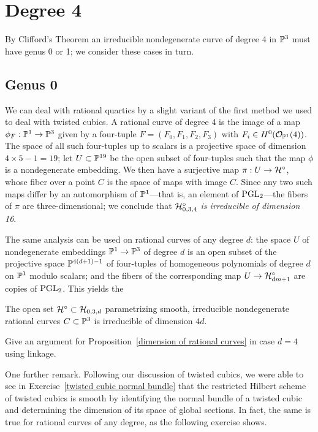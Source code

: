 \section{Degree 4}

By Clifford's Theorem  an irreducible nondegenerate curve of degree 4 in $\PP^{3}$ must have genus 0 or 1; we consider these cases in turn.

\subsection{Genus 0}\label{degree 4 genus 0}

We can deal with rational quartics by a slight variant of the first method we used to deal with twisted cubics. A rational curve of degree 4 is the image of a map $\phi_F : \PP^1 \to \PP^3$ given by a four-tuple $F = (F_0,F_1,F_2,F_3)$ with $F_i \in H^0(\cO_{\PP^1}(4))$. The space of all such four-tuples up to scalars is a projective space of dimension $4 \times 5 - 1 = 19$; let $U \subset \PP^{19}$ be the open subset of four-tuples such that the map $\phi$ is a nondegenerate embedding. We then have a surjective map $\pi : U \to \cH^\circ$, whose fiber over a point $C$ is the space of maps with image $C$. Since any two such maps differ by an automorphism of $\PP^1$---that is, an element of $\PGL_2$---the fibers of $\pi$ are three-dimensional; we conclude that \emph{$\cH^\circ_{0,3,4}$ is irreducible of dimension 16}.

The same analysis can be used on rational curves of any degree $d$: the space $U$ of nondegenerate embeddings $\PP^1 \to \PP^3$ of degree $d$ is an open subset of the projective space $\PP^{4(d+1)-1}$ of four-tuples of homogeneous polynomials of degree $d$ on $\PP^1$ modulo scalars; and the fibers of the corresponding map $U \to \cH^\circ_{dm+1}$ are copies of $\PGL_2$. This yields the

\begin{proposition}\label{dimension of rational curves}
The open set $\cH^\circ \subset \cH_{0,3,d}$ parametrizing smooth, irreducible nondegenerate rational curves $C \subset \PP^3$ is irreducible of dimension $4d$.
\end{proposition}

\begin{exercise}
Give an argument for Proposition~\ref{dimension of rational curves} in case $d=4$ using linkage. 
\end{exercise}

One further remark. Following our discussion of twisted cubics, we were able to see in Exercise~\ref{twisted cubic normal bundle} that the restricted Hilbert scheme of twisted cubics is smooth by identifying the normal bundle of a twisted cubic and determining the dimension of its space of global sections. In fact, the same is true for rational curves of any degree, as the following exercise shows.

